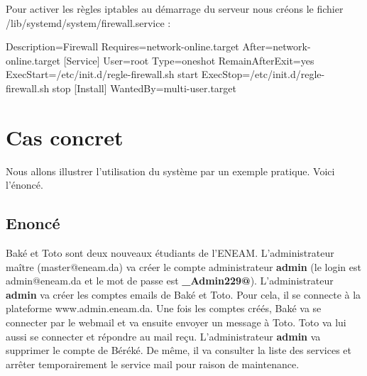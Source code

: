 \documentclass[a4paper,12pt,french]{report} %
\begin{document}
Pour activer les règles iptables au démarrage du serveur nous créons le fichier /lib/systemd/system/firewall.service :
\begin{exempleConsole}
[Unit]
Description=Firewall
Requires=network-online.target
After=network-online.target
[Service]
User=root
Type=oneshot
RemainAfterExit=yes
ExecStart=/etc/init.d/regle-firewall.sh start
ExecStop=/etc/init.d/regle-firewall.sh stop
[Install]
WantedBy=multi-user.target	
\end{exempleConsole}

\section{Cas concret}\label{ref:casConret}
Nous allons illustrer l'utilisation du système par un exemple pratique. Voici l'énoncé.

\subsection{Enoncé}
Baké et Toto sont deux nouveaux étudiants de l'ENEAM. L'administrateur maître (master@eneam.da) va créer le compte administrateur \textbf{admin} (le login est admin@eneam.da et le mot de passe est \textbf{\_Admin229@}). L'administrateur \textbf{admin} va créer les comptes emails de Baké et Toto. Pour cela, il se connecte à la plateforme www.admin.eneam.da. Une fois les comptes créés, Baké va se connecter par le webmail et va ensuite envoyer un message à Toto. Toto va lui aussi se connecter et répondre au mail reçu. L'administrateur \textbf{admin} va supprimer le compte de Béréké. De même, il va consulter la liste des services et arrêter temporairement le service mail pour raison de maintenance.
\end{document}
